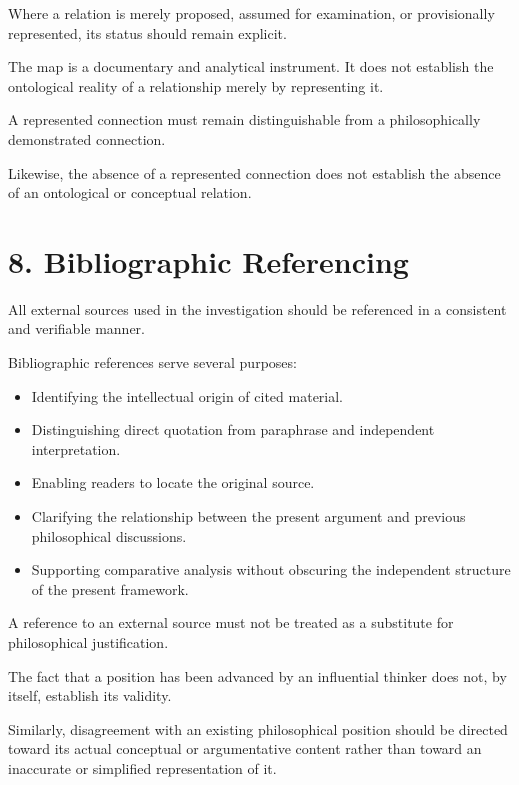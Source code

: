 Where a relation is merely proposed, assumed
for examination, or provisionally represented,
its status should remain explicit.

The map is a documentary and analytical instrument.
It does not establish the ontological reality
of a relationship merely by representing it.

A represented connection must remain distinguishable
from a philosophically demonstrated connection.

Likewise, the absence of a represented connection
does not establish the absence of an ontological
or conceptual relation.


\section*{8. Bibliographic Referencing}

All external sources used in the investigation
should be referenced in a consistent and
verifiable manner.

Bibliographic references serve several purposes:

\begin{itemize}
    \item Identifying the intellectual origin
    of cited material.
    \item Distinguishing direct quotation from
    paraphrase and independent interpretation.
    \item Enabling readers to locate the original source.
    \item Clarifying the relationship between
    the present argument and previous philosophical
    discussions.
    \item Supporting comparative analysis without
    obscuring the independent structure of the
    present framework.
\end{itemize}

A reference to an external source must not be
treated as a substitute for philosophical
justification.

The fact that a position has been advanced
by an influential thinker does not, by itself,
establish its validity.

Similarly, disagreement with an existing
philosophical position should be directed
toward its actual conceptual or argumentative
content rather than toward an inaccurate
or simplified representation of it.

